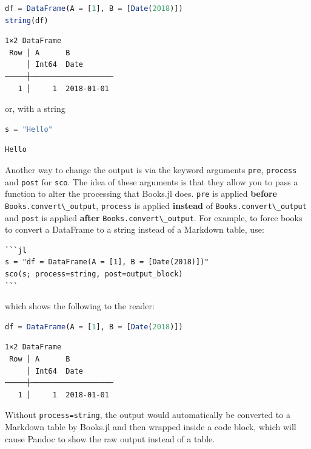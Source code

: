 \documentclass[
  notoc %
]{tufte-book}
\newcommand{\passthrough}[1]{#1}
\begin{document}
\begin{lstlisting}[language=Julia]
df = DataFrame(A = [1], B = [Date(2018)])
string(df)
\end{lstlisting}

\begin{lstlisting}[language=Output]
1×2 DataFrame
 Row │ A      B
     │ Int64  Date
─────┼───────────────────
   1 │     1  2018-01-01
\end{lstlisting}

or, with a string

\begin{lstlisting}[language=Julia]
s = "Hello"
\end{lstlisting}

\begin{lstlisting}[language=Output]
Hello
\end{lstlisting}

Another way to change the output is via the keyword arguments
\passthrough{\lstinline!pre!}, \passthrough{\lstinline!process!} and
\passthrough{\lstinline!post!} for \passthrough{\lstinline!sco!}. The
idea of these arguments is that they allow you to pass a function to
alter the processing that Books.jl does. \passthrough{\lstinline!pre!}
is applied \textbf{before}
\passthrough{\lstinline!Books.convert\_output!},
\passthrough{\lstinline!process!} is applied \textbf{instead} of
\passthrough{\lstinline!Books.convert\_output!} and
\passthrough{\lstinline!post!} is applied \textbf{after}
\passthrough{\lstinline!Books.convert\_output!}. For example, to force
books to convert a DataFrame to a string instead of a Markdown table,
use:

\begin{lstlisting}
```jl
s = "df = DataFrame(A = [1], B = [Date(2018)])"
sco(s; process=string, post=output_block)
```
\end{lstlisting}

which shows the following to the reader:

\begin{lstlisting}[language=Julia]
df = DataFrame(A = [1], B = [Date(2018)])
\end{lstlisting}

\begin{lstlisting}[language=Output]
1×2 DataFrame
 Row │ A      B
     │ Int64  Date
─────┼───────────────────
   1 │     1  2018-01-01
\end{lstlisting}

Without \passthrough{\lstinline!process=string!}, the output would
automatically be converted to a Markdown table by Books.jl and then
wrapped inside a code block, which will cause Pandoc to show the raw
output instead of a table.
\end{document}
